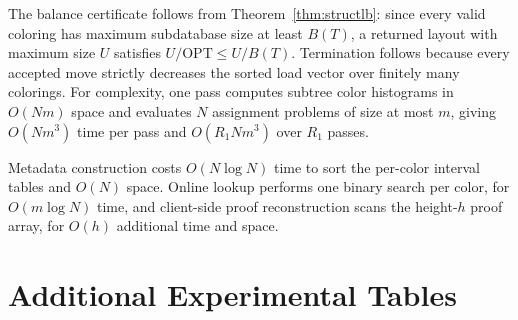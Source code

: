 The balance certificate follows from Theorem~\ref{thm:structlb}: since every valid coloring has maximum subdatabase size at least \(B(T)\), a returned layout with maximum size \(U\) satisfies \(U/\mathrm{OPT}\le U/B(T)\). Termination follows because every accepted move strictly decreases the sorted load vector over finitely many colorings. For complexity, one pass computes subtree color histograms in \(O(Nm)\) space and evaluates \(N\) assignment problems of size at most \(m\), giving \(O(Nm^3)\) time per pass and \(O(R_1Nm^3)\) over \(R_1\) passes.

Metadata construction costs \(O(N\log N)\) time to sort the per-color interval tables and \(O(N)\) space. Online lookup performs one binary search per color, for \(O(m\log N)\) time, and client-side proof reconstruction scans the height-\(h\) proof array, for \(O(h)\) additional time and space.

\section{Additional Experimental Tables}
\label{app:experiments}

\begin{table}[H]
\centering
\caption{\ActiveBalance{} ablation on real height-\(128\) workloads.}
\label{tab:app_activebalance}
\scriptsize
\setlength{\tabcolsep}{3pt}
\end{table}

